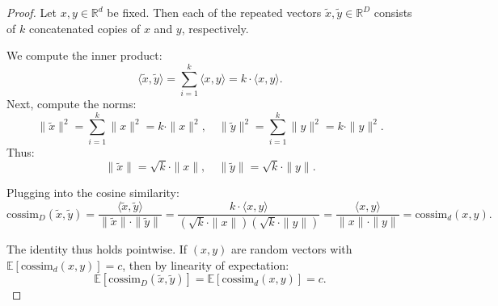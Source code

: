 \documentclass{article}
\theoremstyle{plain}
\newtheorem{proposition}[theorem]{Proposition}
\theoremstyle{definition}
\theoremstyle{remark}
\begin{document}
\begin{appendices}
\begin{proof}
Let $x, y \in \mathbb{R}^d$ be fixed. Then each of the repeated vectors $\tilde{x}, \tilde{y} \in \mathbb{R}^{D}$ consists of $k$ concatenated copies of $x$ and $y$, respectively.

We compute the inner product:
\[
\langle \tilde{x}, \tilde{y} \rangle
= \sum_{i=1}^{k} \langle x, y \rangle = k \cdot \langle x, y \rangle.
\]
Next, compute the norms:
\[
\|\tilde{x}\|^2 = \sum_{i=1}^{k} \|x\|^2 = k \cdot \|x\|^2, \quad
\|\tilde{y}\|^2 = \sum_{i=1}^{k} \|y\|^2 = k \cdot \|y\|^2.
\]
Thus:
\[
\|\tilde{x}\| = \sqrt{k} \cdot \|x\|, \quad
\|\tilde{y}\| = \sqrt{k} \cdot \|y\|.
\]

Plugging into the cosine similarity:
\[
\mathrm{cossim}_D(\tilde{x}, \tilde{y})
= \frac{\langle \tilde{x}, \tilde{y} \rangle}{\|\tilde{x}\| \cdot \|\tilde{y}\|}
= \frac{k \cdot \langle x, y \rangle}{(\sqrt{k} \cdot \|x\|)(\sqrt{k} \cdot \|y\|)}
= \frac{\langle x, y \rangle}{\|x\| \cdot \|y\|}
= \mathrm{cossim}_d(x, y).
\]

The identity thus holds pointwise. If $(x, y)$ are random vectors with $\mathbb{E}[\mathrm{cossim}_d(x, y)] = c$, then by linearity of expectation:
\[
\mathbb{E}[\mathrm{cossim}_D(\tilde{x}, \tilde{y})]
= \mathbb{E}[\mathrm{cossim}_d(x, y)] = c.
\]
\end{proof}



\end{appendices}
\end{document}
